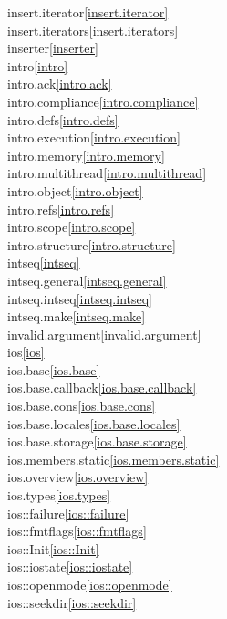 \begin{multicols}{2}
insert.iterator\quad\ref{insert.iterator}\\
insert.iterators\quad\ref{insert.iterators}\\
inserter\quad\ref{inserter}\\
intro\quad\ref{intro}\\
intro.ack\quad\ref{intro.ack}\\
intro.compliance\quad\ref{intro.compliance}\\
intro.defs\quad\ref{intro.defs}\\
intro.execution\quad\ref{intro.execution}\\
intro.memory\quad\ref{intro.memory}\\
intro.multithread\quad\ref{intro.multithread}\\
intro.object\quad\ref{intro.object}\\
intro.refs\quad\ref{intro.refs}\\
intro.scope\quad\ref{intro.scope}\\
intro.structure\quad\ref{intro.structure}\\
intseq\quad\ref{intseq}\\
intseq.general\quad\ref{intseq.general}\\
intseq.intseq\quad\ref{intseq.intseq}\\
intseq.make\quad\ref{intseq.make}\\
invalid.argument\quad\ref{invalid.argument}\\
ios\quad\ref{ios}\\
ios.base\quad\ref{ios.base}\\
ios.base.callback\quad\ref{ios.base.callback}\\
ios.base.cons\quad\ref{ios.base.cons}\\
ios.base.locales\quad\ref{ios.base.locales}\\
ios.base.storage\quad\ref{ios.base.storage}\\
ios.members.static\quad\ref{ios.members.static}\\
ios.overview\quad\ref{ios.overview}\\
ios.types\quad\ref{ios.types}\\
ios::failure\quad\ref{ios::failure}\\
ios::fmtflags\quad\ref{ios::fmtflags}\\
ios::Init\quad\ref{ios::Init}\\
ios::iostate\quad\ref{ios::iostate}\\
ios::openmode\quad\ref{ios::openmode}\\
ios::seekdir\quad\ref{ios::seekdir}\\

\end{multicols}
